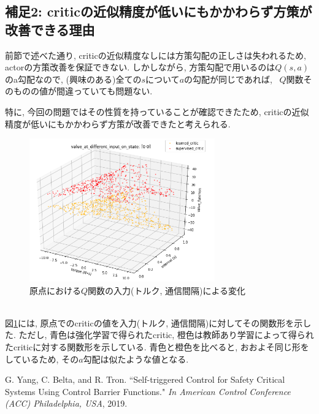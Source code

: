 \documentclass{jsarticle}
\begin{document}
\subsection{補足2: criticの近似精度が低いにもかかわらず方策が改善できる理由}
前節で述べた通り, criticの近似精度なしには方策勾配の正しさは失われるため, actorの方策改善を保証できない. しかしながら, 方策勾配で用いるのは$Q(s,a)$のa勾配なので, (興味のある)全ての$s$について$a$の勾配が同じであれば, ~$Q$関数そのものの値が間違っていても問題ない. \par
特に, 今回の問題ではその性質を持っていることが確認できたため, criticの近似精度が低いにもかかわらず方策が改善できたと考えられる. 
\begin{figure}[h]
	\centering
 	\includegraphics[width=8cm]{a_gradient.png}
 	\caption{原点における$Q$関数の入力(トルク, 通信間隔)による変化} \label{a_gradient}
\end{figure}\\
図\ref{a_gradient}には, 原点でのcriticの値を入力(トルク, 通信間隔)に対してその関数形を示した. ただし, 青色は強化学習で得られたcritic, 橙色は教師あり学習によって得られたcriticに対する関数形を示している. 青色と橙色を比べると, おおよそ同じ形をしているため, その$a$勾配は似たような値となる.


\begin{thebibliography}{10}
G. Yang, C. Belta, and R. Tron. “Self-triggered Control for Safety Critical Systems Using Control Barrier Functions."  \textit{In American Control Conference (ACC) Philadelphia, USA}, 2019.
 
 \end{thebibliography}
\end{document}
